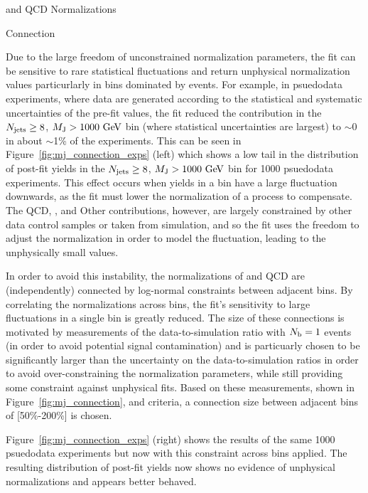 \begin{section}{\ttbar and QCD Normalizations}
\begin{subsection}{\MJ Connection}
\label{subsec:mj_connection}

Due to the large freedom of unconstrained normalization parameters, the fit can be sensitive to rare statistical fluctuations and return unphysical normalization values particurlarly in bins dominated by \ttbar events.
For example, in psuedodata experiments, where data are generated according to the statistical and systematic uncertainties of the pre-fit values, the fit reduced the \ttbar contribution in the $N_{\mathrm{jets}} \geq 8$, $M_{\mathrm{J}} > 1000~\mathrm{Ge\kern -0.1em V}$ bin (where statistical uncertainties are largest) to $\sim$0 in about $\sim$1\% of the experiments.
This can be seen in Figure~\ref{fig:mj_connection_exps} (left) which shows a low tail in the distribution of post-fit \ttbar yields in the $N_{\mathrm{jets}} \geq 8$, $M_{\mathrm{J}} > 1000~\mathrm{Ge\kern -0.1em V}$ bin for 1000 psuedodata experiments.
This effect occurs when yields in a bin have a large fluctuation downwards, as the fit must lower the normalization of a process to compensate.
The QCD, \Wjets, and Other contributions, however, are largely constrained by other data control samples or taken from simulation, and so the fit uses the freedom to adjust the \ttbar normalization in order to model the fluctuation, leading to the unphysically small values.

In order to avoid this instability, the normalizations of \ttbar and QCD are (independently) connected by log-normal constraints between adjacent \MJ bins.
By correlating the normalizations across \MJ bins, the fit's sensitivity to large fluctuations in a single bin is greatly reduced.
The size of these connections is motivated by measurements of the data-to-simulation ratio with $N_{\mathrm{b}} = 1$ events (in order to avoid potential signal contamination) and is particuarly chosen to be significantly larger than the uncertainty on the data-to-simulation ratios in order to avoid over-constraining the normalization parameters, while still providing some constraint against unphysical fits.
Based on these measurements, shown in Figure~\ref{fig:mj_connection}, and criteria, a connection size between adjacent bins of [50\%-200\%] is chosen.

Figure~\ref{fig:mj_connection_exps} (right) shows the results of the same 1000 psuedodata experiments but now with this constraint across \MJ bins applied.
The resulting distribution of post-fit \ttbar yields now shows no evidence of unphysical normalizations and appears better behaved.


\end{subsection}
\end{section}
